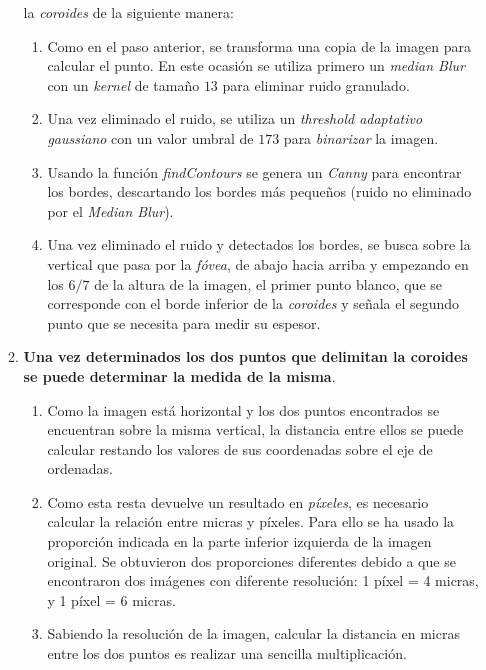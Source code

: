 \begin{enumerate}
\begin{enumerate}[label*=\arabic*.]
{      la \emph{coroides}} de la siguiente manera:
    \begin{enumerate}[label*=\arabic*.]
    \item Como en el paso anterior, se transforma una copia de la
      imagen para calcular el punto. En este ocasión se utiliza
      primero un \emph{median Blur} con un \emph{kernel} de tamaño
      $13$ para eliminar ruido granulado.
    \item Una vez eliminado el ruido, se utiliza un \emph{threshold
        adaptativo
        gaussiano} con
      un valor umbral de $173$ para \emph{binarizar} la imagen.
    \item Usando la función
      \emph{findContours} se genera un
      \emph{Canny} para encontrar los
      bordes, descartando los bordes más pequeños (ruido no eliminado
      por el \emph{Median Blur}).
    \item Una vez eliminado el ruido y detectados los bordes, se busca
      sobre la vertical que pasa por la \emph{fóvea}, de abajo hacia
      arriba y empezando en los $6/7$ de la altura de la imagen, el
      primer punto blanco, que se corresponde con el borde inferior de
      la \emph{coroides} y señala el segundo punto que se necesita
      para medir su espesor.
    \end{enumerate}
  \item \textbf{Una vez determinados los dos puntos que delimitan la
      coroides se puede determinar la medida de la misma}.
    \begin{enumerate}[label*=\arabic*.]
    \item Como la imagen está horizontal y los dos puntos encontrados
      se encuentran sobre la misma vertical, la distancia entre ellos
      se puede calcular restando los valores de sus coordenadas sobre
      el eje de ordenadas.
    \item Como esta resta devuelve un resultado en \emph{píxeles}, es
      necesario calcular la relación entre micras y píxeles. Para ello
      se ha usado la proporción indicada en la parte inferior
      izquierda de la imagen original. Se obtuvieron dos proporciones
      diferentes debido a que se encontraron dos imágenes con diferente
      resolución: 1 píxel = 4 micras, y 1 píxel = 6 micras.
    \item Sabiendo la resolución de la imagen, calcular la distancia en
      micras entre los dos puntos es realizar una sencilla multiplicación.
    \end{enumerate}
  \end{enumerate}
\end{enumerate}


